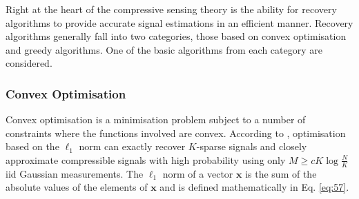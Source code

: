 \documentclass[conference]{IEEEtran}
\begin{document}
Right at the heart of the compressive sensing theory is the ability for recovery algorithms to provide accurate signal estimations in an efficient manner. Recovery algorithms generally fall into two categories, those based on convex optimisation and greedy algorithms. One of the basic algorithms from each category are considered.   

\subsubsection{Convex Optimisation}
\label{sec:convex-optimization}

Convex optimisation is a minimisation problem subject to a number of constraints where the functions involved are convex. According to \cite{Baraniuk2007}, optimisation based on the $\ell_1$ norm can exactly recover $K$-sparse signals and closely approximate compressible signals with high probability using only $M  \geq cK \log \frac{N}{K} $ iid Gaussian measurements. The $\ell_1$ norm of a vector $\boldsymbol{x}$ is the sum of the absolute values of the elements of $\boldsymbol{x}$ and is defined mathematically in Eq. \eqref{eq:57}.  %

 


%
%
\end{document}
